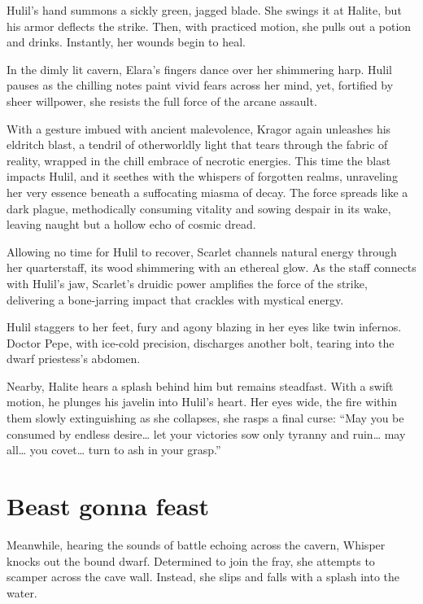\documentclass[
  letterpaper,12pt,twoside,twocolumn,openany,
  nodeprecatedcode,bg=full]{dndbook}
\begin{document}
Hulil's hand summons a sickly green, jagged blade. She swings it at
Halite, but his armor deflects the strike. Then, with practiced motion,
she pulls out a potion and drinks. Instantly, her wounds begin to heal.

In the dimly lit cavern, Elara's fingers dance over her shimmering harp.
Hulil pauses as the chilling notes paint vivid fears across her mind,
yet, fortified by sheer willpower, she resists the full force of the
arcane assault.

With a gesture imbued with ancient malevolence, Kragor again unleashes
his eldritch blast, a tendril of otherworldly light that tears through
the fabric of reality, wrapped in the chill embrace of necrotic
energies. This time the blast impacts Hulil, and it seethes with the
whispers of forgotten realms, unraveling her very essence beneath a
suffocating miasma of decay. The force spreads like a dark plague,
methodically consuming vitality and sowing despair in its wake, leaving
naught but a hollow echo of cosmic dread.

Allowing no time for Hulil to recover, Scarlet channels natural energy
through her quarterstaff, its wood shimmering with an ethereal glow. As
the staff connects with Hulil's jaw, Scarlet's druidic power amplifies
the force of the strike, delivering a bone-jarring impact that crackles
with mystical energy.

Hulil staggers to her feet, fury and agony blazing in her eyes like twin
infernos. Doctor Pepe, with ice-cold precision, discharges another bolt,
tearing into the dwarf priestess's abdomen.

Nearby, Halite hears a splash behind him but remains steadfast. With a
swift motion, he plunges his javelin into Hulil's heart. Her eyes wide,
the fire within them slowly extinguishing as she collapses, she rasps a
final curse: ``May you be consumed by endless desire\ldots{} let your
victories sow only tyranny and ruin\ldots{} may all\ldots{} you
covet\ldots{} turn to ash in your grasp.''

\section{Beast gonna feast}\label{beast-gonna-feast}

Meanwhile, hearing the sounds of battle echoing across the cavern,
Whisper knocks out the bound dwarf. Determined to join the fray, she
attempts to scamper across the cave wall. Instead, she slips and falls
with a splash into the water.
\end{document}
